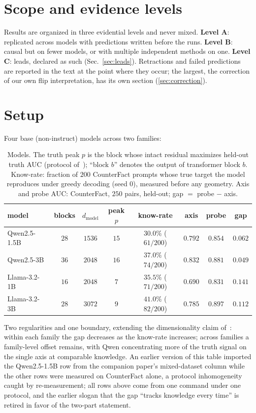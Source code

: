 \documentclass[11pt]{article}
\begin{document}
\section{Scope and evidence levels}
\label{sec:scope}

Results are organized in three evidential levels and never mixed.
\textbf{Level A}: replicated across models with predictions written before
the runs. \textbf{Level B}: causal but on fewer models, or with multiple
independent methods on one. \textbf{Level C}: leads, declared as such
(Sec.~\ref{sec:leads}). Retractions and failed predictions are reported in
the text at the point where they occur; the largest, the correction of our
own flip interpretation, has its own section (\ref{sec:correction}).

\section{Setup}
\label{sec:setup}

Four base (non-instruct) models across two families:

\begin{table}[H]
\centering
\caption{Models. The truth peak $p$ is the block whose intact residual
maximizes held-out truth AUC (protocol of~\cite{companion}); ``block $b$''
denotes the output of transformer block $b$. Know-rate: fraction of $200$
CounterFact prompts whose true target the model reproduces under greedy
decoding (seed $0$), measured before any geometry. Axis and probe AUC:
CounterFact, $250$ pairs, held-out; gap $=$ probe $-$ axis.}
\label{tab:models}
\begin{tabular}{lccccccc}
\toprule
model & blocks & $d_{\mathrm{model}}$ & peak $p$ & know-rate & axis & probe & gap \\
\midrule
Qwen2.5-1.5B  & $28$ & $1536$ & $15$ & $30.0\%$ ($61/200$) & $0.792$ & $0.854$ & $0.062$ \\
Qwen2.5-3B    & $36$ & $2048$ & $16$ & $37.0\%$ ($74/200$) & $0.832$ & $0.881$ & $0.049$ \\
Llama-3.2-1B  & $16$ & $2048$ & $7$  & $35.5\%$ ($71/200$) & $0.690$ & $0.831$ & $0.141$ \\
Llama-3.2-3B  & $28$ & $3072$ & $9$  & $41.0\%$ ($82/200$) & $0.785$ & $0.897$ & $0.112$ \\
\bottomrule
\end{tabular}
\end{table}

Two regularities and one boundary, extending the dimensionality claim
of~\cite{companion}: within each family the gap decreases as the know-rate
increases; across families a family-level offset remains, with Qwen
concentrating more of the truth signal on the single axis at comparable
knowledge. An earlier version of this table imported the Qwen2.5-1.5B row
from the companion paper's mixed-dataset column while the other rows were
measured on CounterFact alone, a protocol inhomogeneity caught by
re-measurement; all rows above come from one command under one protocol,
and the earlier slogan that the gap ``tracks knowledge every time'' is
retired in favor of the two-part statement.
\end{document}
